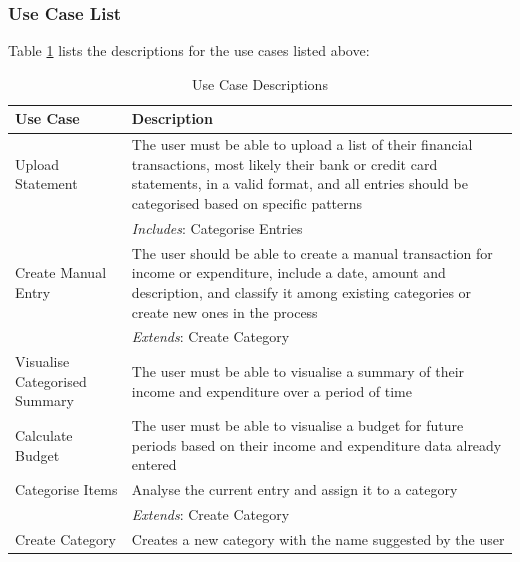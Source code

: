 \subsubsection{Use Case List} \label{sec:Requirements.FunctionalRequirements.UseCaseList}
Table \ref{tab:UseCaseDescriptions} lists the descriptions for the use cases
listed above:
\begin{table}[ht!]
  \centering
  \begin{tabular}{|p{4cm}|p{12cm}|}
    \hline
    \textbf{Use Case}&\textbf{Description}\\
    \hline
    Upload Statement&The user must be able to upload a list of their
                     financial transactions, most likely their bank
                     or credit card statements, in a valid format, and all
                     entries should be categorised based on specific patterns\\
                    &\emph{Includes}: Categorise Entries\\
    \hline
    Create Manual Entry&The user should be able to create a manual transaction for
                        income or expenditure, include a date, amount and
                        description, and classify it among existing categories
                        or create new ones in the
                        process\\
                        &\emph{Extends}: Create Category\\
    \hline
    Visualise Categorised Summary&The user must be able to visualise
                                  a summary of their income and expenditure
                                  over a period of time\\
    \hline
    Calculate Budget&The user must be able to visualise a budget for future
                     periods based on their income and expenditure data 
                     already entered\\
    \hline
    Categorise Items&Analyse the current entry and assign it to a category\\
                    &\emph{Extends}: Create Category\\
    \hline
    Create Category&Creates a new category with the name suggested by the
                        user\\

    \hline
  \end{tabular}
  \caption{Use Case Descriptions} \label{tab:UseCaseDescriptions}
\end{table}
\FloatBarrier



